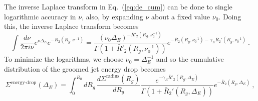 \documentclass[letterpaper,11pt]{article}
\DeclareRobustCommand{\Eq}[1]{Eq.~(\ref{#1})}
\begin{document}
The inverse Laplace transform in \Eq{eq:de_cum} can be done to single logarithmic accuracy in $\nu$, also, by expanding $\nu$ about a fixed value $\nu_0$.  Doing this, the inverse Laplace transform becomes
\begin{equation}
\int \frac{d\nu}{2\pi i \nu}e^{\nu \Delta_E}  e^{-R_2\left(R_g,\nu^{-1}\right)} = \frac{\left(  \nu_0 \Delta_E \right)^{-\bar{R}'_2\left(R_g,\nu_0^{-1}\right)}}{\Gamma \left(1+\bar{R}'_2\left(R_g,\nu_0^{-1}\right)\right)}e^{-\bar{R}_2\left(R_g,\nu_0^{-1}\right) - \gamma_E \bar{R}_2'\left(R_g,\nu_0^{-1}\right)} \ .
\end{equation}
To minimize the logarithms, we choose $\nu_0=\Delta_E^{-1}$ and so the cumulative distribution of the groomed jet energy drop becomes
\begin{equation}
\Sigma^\text{energy-drop}(\Delta_E) = \int_0^{R_0} dR_g \, \frac{d \Sigma^\text{radius}(R_g)}{d R_g} \frac{e^{- \gamma_E \bar{R}'_2(R_g,\Delta_E)}}{\Gamma (1+\bar{R}_2'(R_g,\Delta_E))}e^{-\bar{R}_2(R_g,\Delta_E)} \ ,
\end{equation}
\end{document}
